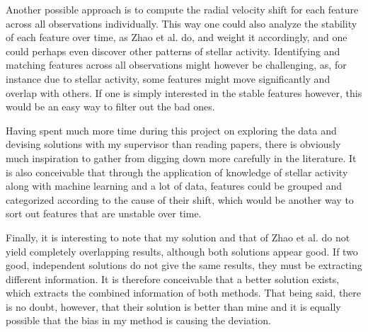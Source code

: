Another possible approach is to compute the radial velocity shift for each feature across all observations individually. This way one could also analyze the stability of each feature over time, as Zhao et al. do, and weight it accordingly, and one could perhaps even discover other patterns of stellar activity. Identifying and matching features across all observations might however be challenging, as, for instance due to stellar activity, some features might move significantly and overlap with others. If one is simply interested in the stable features however, this would be an easy way to filter out the bad ones. 

Having spent much more time during this project on exploring the data and devising solutions with my supervisor than reading papers, there is obviously much inspiration to gather from digging down more carefully in the literature. It is also conceivable that through the application of knowledge of stellar activity along with machine learning and a lot of data, features could be grouped and categorized according to the cause of their shift, which would be another way to sort out features that are unstable over time.

Finally, it is interesting to note that my solution and that of Zhao et al. do not yield completely overlapping results, although both solutions appear good. If two good, independent solutions do not give the same results, they must be extracting different information. It is therefore conceivable that a better solution exists, which extracts the combined information of both methods. That being said, there is no doubt, however, that their solution is better than mine and it is equally possible that the bias in my method is causing the deviation.